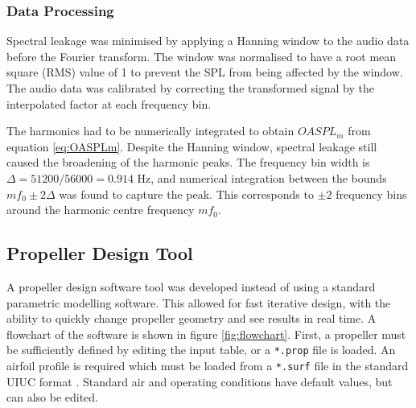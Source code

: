 \documentclass[12pt,a4paper]{article}
\begin{document}


\subsubsection{Data Processing}


Spectral leakage was minimised by applying a Hanning window to the audio data before the Fourier transform.
The window was normalised to have a root mean square (RMS) value of 1 to prevent the SPL from being affected by the window.
The audio data was calibrated by correcting the transformed signal by the interpolated factor at each frequency bin.


The harmonics had to be numerically integrated to obtain $OASPL_m$ from equation \ref{eq:OASPLm}.
Despite the Hanning window, spectral leakage still caused the broadening of the harmonic peaks.
The frequency bin width is $ \Delta = 51200 / 56000 = 0.914$ Hz, and numerical integration between the bounds $ m f_0 \pm 2 \Delta $ 
was found to capture the peak.
This corresponds to $\pm2$ frequency bins around the harmonic centre frequency $m f_0$.


\subsection{Propeller Design Tool}

A propeller design software tool was developed instead of using a standard parametric modelling software.
This allowed for fast iterative design, with the ability to quickly change propeller geometry and see results in real time.
A flowchart of the software is shown in figure \ref{fig:flowchart}.
First, a propeller must be sufficiently defined by editing the input table, or a \texttt{*.prop} file is loaded.
An airfoil profile is required which must be loaded from a \texttt{*.surf} file in the standard UIUC format \cite{uiuc_database}.
Standard air and operating conditions have default values, but can also be edited.
\end{document}
